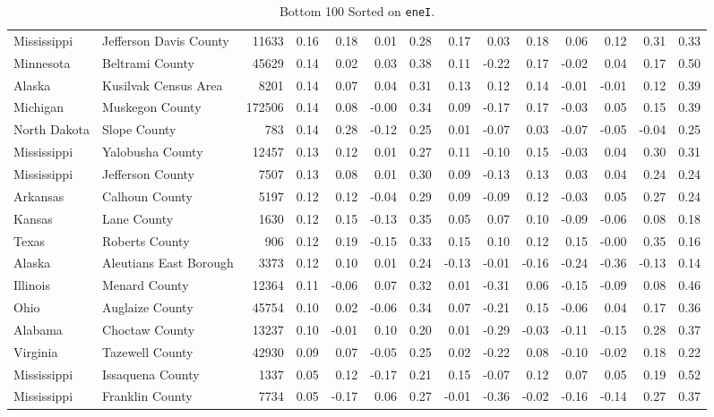 \documentclass[10pt, letterpaper]{article}
\begin{document}
\begin{spacing}{1.4}
\begin{table}
{\begin{tabular}{llrrrrrrrrrrrr}
Mississippi & Jefferson Davis County & 11633 & 0.16 & 0.18 & 0.01 & 0.28 & 0.17 & 0.03 & 0.18 & 0.06 & 0.12 & 0.31 & 0.33 \\
Minnesota & Beltrami County & 45629 & 0.14 & 0.02 & 0.03 & 0.38 & 0.11 & -0.22 & 0.17 & -0.02 & 0.04 & 0.17 & 0.50 \\
Alaska & Kusilvak Census Area & 8201 & 0.14 & 0.07 & 0.04 & 0.31 & 0.13 & 0.12 & 0.14 & -0.01 & -0.01 & 0.12 & 0.39 \\
Michigan & Muskegon County & 172506 & 0.14 & 0.08 & -0.00 & 0.34 & 0.09 & -0.17 & 0.17 & -0.03 & 0.05 & 0.15 & 0.39 \\
North Dakota & Slope County & 783 & 0.14 & 0.28 & -0.12 & 0.25 & 0.01 & -0.07 & 0.03 & -0.07 & -0.05 & -0.04 & 0.25 \\
Mississippi & Yalobusha County & 12457 & 0.13 & 0.12 & 0.01 & 0.27 & 0.11 & -0.10 & 0.15 & -0.03 & 0.04 & 0.30 & 0.31 \\
Mississippi & Jefferson County & 7507 & 0.13 & 0.08 & 0.01 & 0.30 & 0.09 & -0.13 & 0.13 & 0.03 & 0.04 & 0.24 & 0.24 \\
Arkansas & Calhoun County & 5197 & 0.12 & 0.12 & -0.04 & 0.29 & 0.09 & -0.09 & 0.12 & -0.03 & 0.05 & 0.27 & 0.24 \\
Kansas & Lane County & 1630 & 0.12 & 0.15 & -0.13 & 0.35 & 0.05 & 0.07 & 0.10 & -0.09 & -0.06 & 0.08 & 0.18 \\
Texas & Roberts County & 906 & 0.12 & 0.19 & -0.15 & 0.33 & 0.15 & 0.10 & 0.12 & 0.15 & -0.00 & 0.35 & 0.16 \\
Alaska & Aleutians East Borough & 3373 & 0.12 & 0.10 & 0.01 & 0.24 & -0.13 & -0.01 & -0.16 & -0.24 & -0.36 & -0.13 & 0.14 \\
Illinois & Menard County & 12364 & 0.11 & -0.06 & 0.07 & 0.32 & 0.01 & -0.31 & 0.06 & -0.15 & -0.09 & 0.08 & 0.46 \\
Ohio & Auglaize County & 45754 & 0.10 & 0.02 & -0.06 & 0.34 & 0.07 & -0.21 & 0.15 & -0.06 & 0.04 & 0.17 & 0.36 \\
Alabama & Choctaw County & 13237 & 0.10 & -0.01 & 0.10 & 0.20 & 0.01 & -0.29 & -0.03 & -0.11 & -0.15 & 0.28 & 0.37 \\
Virginia & Tazewell County & 42930 & 0.09 & 0.07 & -0.05 & 0.25 & 0.02 & -0.22 & 0.08 & -0.10 & -0.02 & 0.18 & 0.22 \\
Mississippi & Issaquena County & 1337 & 0.05 & 0.12 & -0.17 & 0.21 & 0.15 & -0.07 & 0.12 & 0.07 & 0.05 & 0.19 & 0.52 \\
Mississippi & Franklin County & 7734 & 0.05 & -0.17 & 0.06 & 0.27 & -0.01 & -0.36 & -0.02 & -0.16 & -0.14 & 0.27 & 0.37 \\
\hline
\end{tabular}
}
\caption{Bottom 100 Sorted on \texttt{eneI}.}
\end{table}



\end{spacing}
\end{document}
